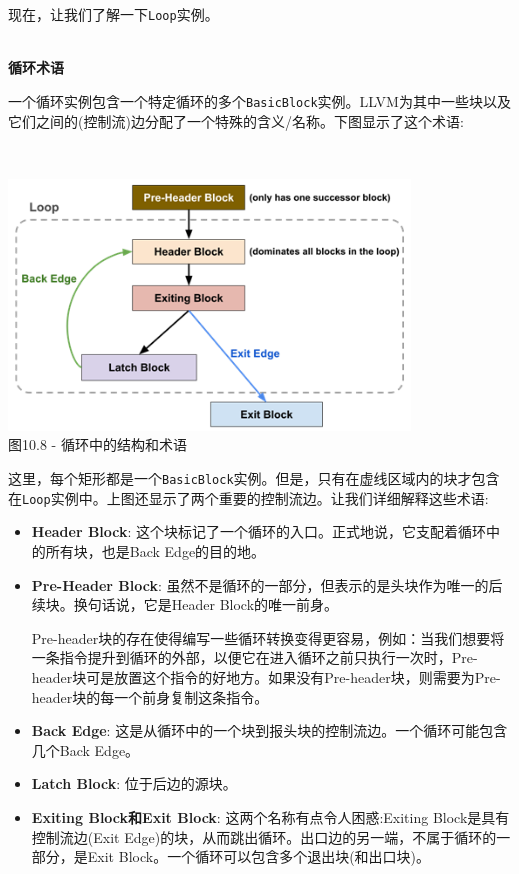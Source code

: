 现在，让我们了解一下\texttt{Loop}实例。

\hspace*{\fill} \\ %
\noindent
\textbf{循环术语}

一个循环实例包含一个特定循环的多个\texttt{BasicBlock}实例。LLVM为其中一些块以及它们之间的(控制流)边分配了一个特殊的含义/名称。下图显示了这个术语:

\hspace*{\fill} \\ %
\begin{center}
\includegraphics[width=0.8\textwidth]{content/3/chapter10/images/8.png}\\
图10.8 - 循环中的结构和术语
\end{center}

这里，每个矩形都是一个\texttt{BasicBlock}实例。但是，只有在虚线区域内的块才包含在\texttt{Loop}实例中。上图还显示了两个重要的控制流边。让我们详细解释这些术语:

\begin{itemize}
\item \textbf{Header Block}: 这个块标记了一个循环的入口。正式地说，它支配着循环中的所有块，也是Back Edge的目的地。

\item \textbf{Pre-Header Block}: 虽然不是循环的一部分，但表示的是头块作为唯一的后续块。换句话说，它是Header Block的唯一前身。

Pre-header块的存在使得编写一些循环转换变得更容易，例如：当我们想要将一条指令提升到循环的外部，以便它在进入循环之前只执行一次时，Pre-header块可是放置这个指令的好地方。如果没有Pre-header块，则需要为Pre-header块的每一个前身复制这条指令。

\item \textbf{Back Edge}: 这是从循环中的一个块到报头块的控制流边。一个循环可能包含几个Back Edge。

\item \textbf{Latch Block}: 位于后边的源块。

\item \textbf{Exiting Block和Exit Block}: 这两个名称有点令人困惑:Exiting Block是具有控制流边(Exit Edge)的块，从而跳出循环。出口边的另一端，不属于循环的一部分，是Exit Block。一个循环可以包含多个退出块(和出口块)。
\end{itemize}

